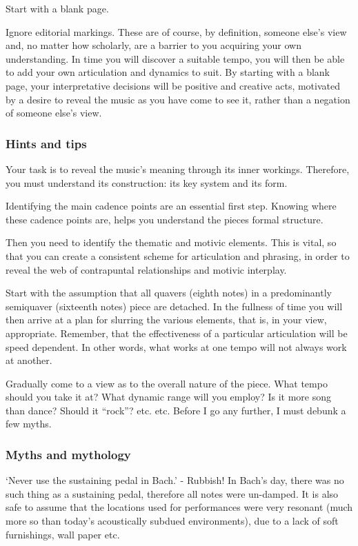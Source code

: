 \documentclass{article}
\begin{document}
Start with a blank page.

Ignore editorial markings.
These are of course, by definition, someone else's view and, no matter how scholarly, are a barrier to you acquiring your own understanding.
In time you will discover a suitable tempo, you will then be able to add your own articulation and dynamics to suit.
By starting with a blank page, your interpretative decisions will be positive and creative acts, motivated by a desire to reveal the music as you have come to see it, rather than a negation of someone else's view.

\subsubsection{Hints and tips}

Your task is to reveal the music's meaning through its inner workings.
Therefore, you must understand its construction: its key system and its form.

Identifying the main cadence points are an essential first step.
Knowing where these cadence points are, helps you understand the pieces formal structure.

Then you need to identify the thematic and motivic elements.
This is vital, so that you can create a consistent scheme for articulation and phrasing, in order to reveal the web of contrapuntal relationships and motivic interplay.

Start with the assumption that all quavers (eighth notes) in a predominantly semiquaver  (sixteenth notes) piece are detached.
In the fullness of time you will then arrive at a plan for slurring the various elements, that is, in your view, appropriate.
Remember, that the effectiveness of a particular articulation will be speed dependent.
In other words, what works at one tempo will not always work at another.

Gradually come to a view as to the overall nature of the piece.
What tempo should you take it at?
What dynamic range will you employ?
Is it more song than dance?
Should it ``rock''?
etc. etc.
\newline\newline
Before I go any further, I must debunk a few myths.

\subsubsection{Myths and mythology}

`Never use the sustaining pedal in Bach.' - Rubbish!
In Bach's day, there was no such thing as a sustaining pedal, therefore all notes were un-damped.
It is also safe to assume that the locations used for performances were very resonant (much more so than today's acoustically subdued environments), due to a lack of soft furnishings, wall paper etc.
\end{document}
